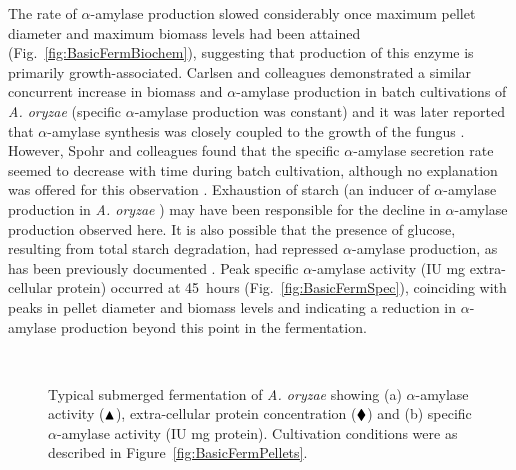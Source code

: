 The rate of $\alpha$-amylase production slowed considerably once maximum pellet diameter and maximum biomass levels had been attained (Fig.~\ref{fig:BasicFermBiochem}), suggesting that production of this enzyme is primarily growth-associated. Carlsen and colleagues demonstrated a similar concurrent increase in biomass and $\alpha$-amylase production in batch cultivations of \emph{A. oryzae} (specific $\alpha$-amylase production was constant) \cite{carlsen1996a} and it was later reported that $\alpha$-amylase synthesis was closely coupled to the growth of the fungus \cite{carlsen1996b}. However, Spohr and colleagues found that the specific $\alpha$-amylase secretion rate seemed to decrease with time during batch cultivation, although no explanation was offered for this observation \cite{spohr1997}. Exhaustion of starch (an inducer of $\alpha$-amylase production in \emph{A. oryzae} \cite{agger2002}) may have been responsible for the decline in $\alpha$-amylase production observed here. It is also possible that the presence of glucose, resulting from total starch degradation, had repressed $\alpha$-amylase production, as has been previously documented \cite{carlsen1996b}. Peak specific $\alpha$-amylase activity (IU mg extra-cellular protein) occurred at 45~hours (Fig.~\ref{fig:BasicFermSpec}), coinciding with peaks in pellet diameter and biomass levels and indicating a reduction in $\alpha$-amylase production beyond this point in the fermentation.

\begin{figure}[htbp]
	\centering
	\captionsetup[subfloat]{position=top}
	\\
	\caption{Typical submerged fermentation of \emph{A. oryzae} showing (a) $\alpha$-amylase activity ($\blacktriangle$), extra-cellular protein concentration ($\blacklozenge$) and (b) specific $\alpha$-amylase activity (IU mg protein). Cultivation conditions were as described in Figure~\ref{fig:BasicFermPellets}.}
	\label{fig:BasicFerm}
\end{figure}

